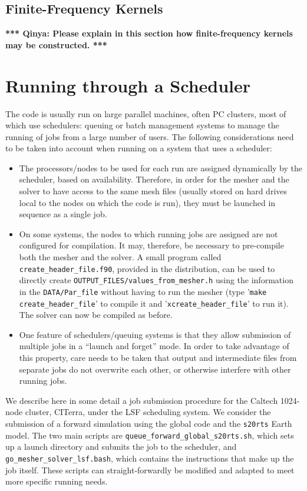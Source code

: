 \documentclass[onecolumn]{article}
\newcommand{\toqinya}[1]{\textbf{*** Qinya: #1 ***}}
\begin{document}
\subsection{Finite-Frequency Kernels}

\toqinya{Please explain in this section how finite-frequency kernels
may be constructed.}

\section{Running through a Scheduler}
\label{section:scheduler}

The code is usually run on large parallel machines, often PC clusters,
most of which use schedulers: queuing or batch management systems to manage
the running of jobs from a large number of users.
The following considerations need to be taken into account when running on
a system that uses a scheduler:
\begin{itemize}
\item The processors/nodes to be used for each run are assigned dynamically
by the scheduler, based on availability.
Therefore, in order for the mesher and the solver to have access to the same
mesh files (usually stored on hard drives local to the nodes on which the
code is run), they must be launched in sequence as a single job.
\item On some systems, the nodes to which running jobs are assigned are
not configured for compilation.
It may, therefore, be necessary to pre-compile both the mesher and the solver.
A small program called \texttt{create\_header\_file.f90}, provided in the
distribution, can be used to directly create
\texttt{OUTPUT\_FILES/values\_from\_mesher.h} using the information in
the \texttt{DATA/Par\_file} without having to run the mesher
(type '\texttt{make create\_header\_file}' to compile it
and '\texttt{xcreate\_header\_file}' to run it).
The solver can now be compiled as before.
\item One feature of schedulers/queuing systems is that they allow
submission of multiple jobs in a ``launch and forget'' mode.
In order to take advantage of this property, care needs to be taken that
output and intermediate files from separate jobs do not overwrite each other,
or otherwise interfere with other running jobs.
\end{itemize}

We describe here in some detail a job submission procedure for the
Caltech 1024-node cluster, CITerra, under the LSF scheduling system.
We consider the submission of a forward simulation using the global
code and the \texttt{s20rts} Earth model.
The two main scripts are \texttt{queue\_forward\_global\_s20rts.sh},
which sets up a launch directory and submits the job to the scheduler,
and \texttt{go\_mesher\_solver\_lsf.bash}, which contains the instructions
that make up the job itself.
These scripts can straight-forwardly be modified and adapted to meet
more specific running needs.
\end{document}
